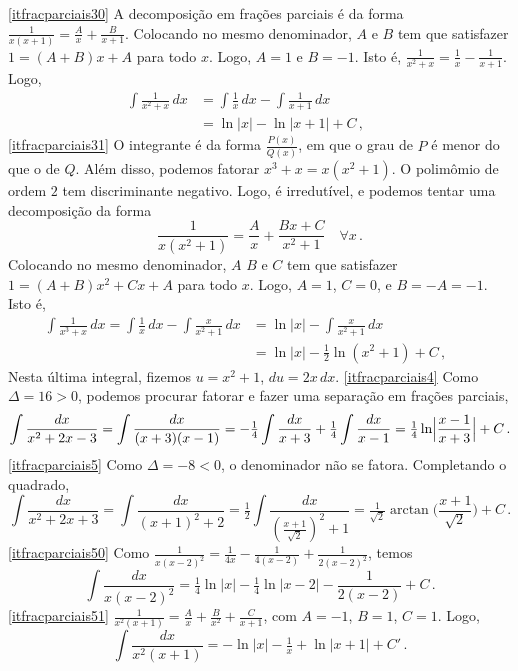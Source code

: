 \begin{exo}
\begin{sol}
\eqref{itfracparciais30}
A decomposição em frações parciais é da forma
$\frac{1}{x(x+1)}=\frac{A}{x}+\frac{B}{x+1}$.
Colocando no mesmo denominador, $A$ e $B$
tem que satisfazer $1=(A+B)x+A$ para todo $x$. Logo, $A=1$ e $B=-1$. Isto é,
$\frac{1}{x^2+x}=\frac{1}{x}-\frac{1}{x+1}$. Logo,
\begin{align*}
\int \frac{1}{x^2+x}\,dx&=\int \frac{1}{x}\,dx-\int\frac{1}{x+1}\,dx\\
&=\ln |x|-\ln |x+1|+C\,,\quad\quad 
\end{align*}
\eqref{itfracparciais31} 
O integrante é da forma $\frac{P(x)}{Q(x)}$, em que o grau 
de $P$ é menor do que o de $Q$. Além disso, podemos fatorar $x^3+x=x(x^2+1)$. O
polimômio de ordem $2$ tem discriminante negativo. Logo, é irredutível,
e podemos tentar uma decomposição da forma
$$
\frac{1}{x(x^2+1)}=\frac{A}{x}+\frac{Bx+C}{x^2+1}\quad \forall x\,.
$$
Colocando no mesmo denominador, $A$ $B$ e $C$ 
tem que satisfazer $1=(A+B)x^2+Cx+A$ para todo $x$. Logo, $A=1$, $C=0$, e
$B=-A=-1$. Isto é,
\begin{align*}
\int \frac{1}{x^3+x}\,dx=\int \frac{1}{x}\,dx-\int\frac{x}{x^2+1}\,dx
&=\ln |x|-\int\frac{x}{x^2+1}\,dx\\
&=\ln |x|-\tfrac{1}{2}\ln (x^2+1)+C\,,\quad\quad 
\end{align*}
Nesta última integral, fizemos $u=x^2+1$, $du=2x\,dx$.
\eqref{itfracparciais4} Como $\Delta=16>0$, podemos procurar fatorar e fazer uma
separação em frações parciais, 
$$\int\frac{dx}{x^2+2x-3}=\int\frac{dx}{(x+3)(x-1)}=-\tfrac14\int\frac{dx}{x+3}
+\tfrac14\int\frac{dx}{x-1}=\tfrac14\ln \Bigl|\frac{x-1}{x+3}\Bigr|+C\,.
$$
\eqref{itfracparciais5} Como $\Delta=-8<0$, o denominador não se fatora.
Completando o quadrado,
$$
\int\frac{dx}{x^2+2x+3}=\int\frac{dx}{(x+1)^2+2}=\tfrac12\int\frac{dx}{(\frac{x+
1}{\sqrt{2}})^2+1}=\tfrac{1}{\sqrt{2}}\arctan\bigl(\frac{x+
1}{\sqrt{2}}\bigr)+C\,.
$$
\eqref{itfracparciais50} Como
$\frac{1}{x(x-2)^2}=\frac{1}{4x}-\frac{1}{4(x-2)}+\frac{1}{2(x-2)^2}$, temos
$$
\int\frac{dx}{x(x-2)^2}=\tfrac14\ln|x|-\tfrac14\ln|x-2|-\frac{1}{2(x-2)}+C\,.
$$
\eqref{itfracparciais51}
$\frac{1}{x^2(x+1)}=\frac{A}{x}+\frac{B}{x^2}+\frac{C}{x+1}$, com $A=-1$,
$B=1$, $C=1$. Logo,
$$
\int\frac{dx}{x^2(x+1)}=-\ln |x|-\tfrac1x+\ln|x+1|+C'\,.
$$ 


\end{sol}
\end{exo}

